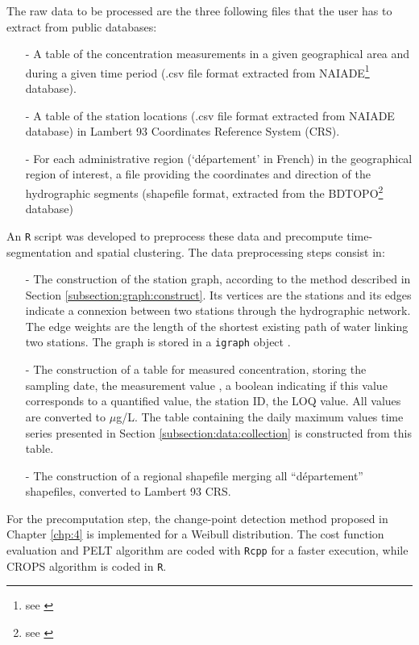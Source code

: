 The raw data to be processed are the three following files that the user has to extract from public databases:
\begin{itemize}
\item[-] A table of the concentration measurements in a given geographical area and during a given time period (.csv file format extracted from NAIADE\footnote{see \cite{Naiade2}} database).
\item[-] A table of the station locations (.csv file format extracted from NAIADE database) in Lambert 93 Coordinates Reference System (CRS).
\item[-] For each administrative region (‘département’ in French) in the geographical region of interest, a file providing the coordinates and direction of the hydrographic segments (shapefile format, extracted from the BDTOPO\footnote{see \cite{BDTOPO}} database)
\end{itemize}
An \texttt{R} script was developed to preprocess these data and precompute time-segmentation and spatial clustering. The data preprocessing steps consist in: 
\begin{itemize}
\item[-] The construction of the station graph, according to the method described in Section \ref{subsection:graph:construct}. Its vertices are the stations and its edges indicate a connexion between two stations through the hydrographic network. The edge weights are the length of the shortest existing path of water linking two stations. The graph is stored in a \texttt{igraph} object \citep{igraph}. 
\item[-] The construction of a table for measured concentration, storing the sampling date, the measurement value , a boolean indicating if this value corresponds to a quantified value, the station ID, the LOQ value. All values are converted to $\mu$g/L. The table containing the daily maximum values time series presented in Section \ref{subsection:data:collection} is constructed from this table.
\item[-] The construction of a regional shapefile merging all ``département'' shapefiles, converted to Lambert 93 CRS.
\end{itemize}

For the precomputation step, the change-point detection method proposed in Chapter \ref{chp:4} is implemented for a Weibull distribution. The cost function evaluation and PELT algorithm are coded with \texttt{Rcpp} for a faster execution, while CROPS algorithm is coded in \texttt{R}.
 

